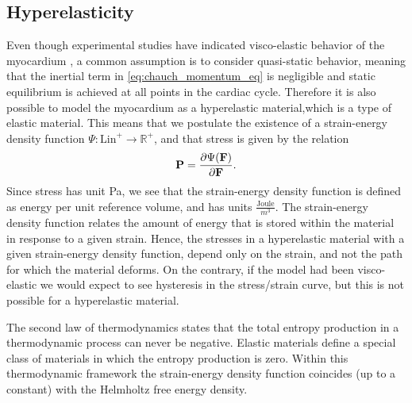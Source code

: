 \subsection{Hyperelasticity}
\label{sec:hyperelasticity}

Even though experimental studies have indicated visco-elastic behavior
of the myocardium \cite{dokos2002shear, gultekin2016orthotropic}, a
common assumption is to consider quasi-static behavior, meaning that
the inertial term in \eqref{eq:chauch_momentum_eq} is negligible and
static equilibrium is achieved at all points in the cardiac cycle. Therefore
it is also possible to model the myocardium as a hyperelastic
material,which is a type of elastic material. 
This means that we postulate the existence of
a strain-energy density function $\Psi:\mathrm{Lin}^+ \rightarrow
\mathbb{R}^+$, and that stress is given by the relation
\begin{align}
\mathbf{P} = \frac{\partial \Psi(\mathbf{F})}{\partial \mathbf{F}}.
\end{align}
Since stress has unit Pa, we see that the strain-energy density
function is defined as energy per unit reference volume, and has units
$\frac{\text{Joule}}{m^3}$. 
The strain-energy density function relates  the amount of
energy that is stored within the material in response to a given
strain. Hence, the stresses in a hyperelastic material with a given
strain-energy density function, depend only on the strain, and not the
path for which the material deforms. On the contrary, if the model had
been visco-elastic we would expect to see hysteresis in the
stress/strain curve, but this is not possible for a hyperelastic
material. 

\begin{remark}
  The second law of thermodynamics states that the total entropy
  production in a thermodynamic process can never be negative. Elastic
  materials define a special class of materials in which the entropy
  production is zero. Within this thermodynamic framework the
  strain-energy density function coincides (up to a constant) with the
  Helmholtz free energy density.
\end{remark}


